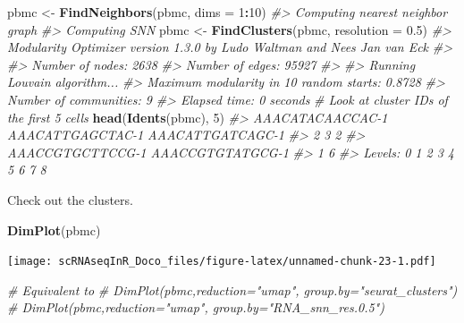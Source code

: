 \documentclass[
]{book}
\newenvironment{Shaded}{\begin{snugshade}}{\end{snugshade}}
\newcommand{\AttributeTok}[1]{\textcolor[rgb]{0.13,0.29,0.53}{#1}}
\newcommand{\CommentTok}[1]{\textcolor[rgb]{0.56,0.35,0.01}{\textit{#1}}}
\newcommand{\DecValTok}[1]{\textcolor[rgb]{0.00,0.00,0.81}{#1}}
\newcommand{\FloatTok}[1]{\textcolor[rgb]{0.00,0.00,0.81}{#1}}
\newcommand{\FunctionTok}[1]{\textcolor[rgb]{0.13,0.29,0.53}{\textbf{#1}}}
\newcommand{\NormalTok}[1]{#1}
\newcommand{\OtherTok}[1]{\textcolor[rgb]{0.56,0.35,0.01}{#1}}
\newcommand{\SpecialCharTok}[1]{\textcolor[rgb]{0.81,0.36,0.00}{\textbf{#1}}}
\begin{document}
\begin{Shaded}
\begin{Highlighting}[]
\NormalTok{pbmc }\OtherTok{\textless{}{-}} \FunctionTok{FindNeighbors}\NormalTok{(pbmc, }\AttributeTok{dims =} \DecValTok{1}\SpecialCharTok{:}\DecValTok{10}\NormalTok{)}
\CommentTok{\#\textgreater{} Computing nearest neighbor graph}
\CommentTok{\#\textgreater{} Computing SNN}
\NormalTok{pbmc }\OtherTok{\textless{}{-}} \FunctionTok{FindClusters}\NormalTok{(pbmc, }\AttributeTok{resolution =} \FloatTok{0.5}\NormalTok{)}
\CommentTok{\#\textgreater{} Modularity Optimizer version 1.3.0 by Ludo Waltman and Nees Jan van Eck}
\CommentTok{\#\textgreater{} }
\CommentTok{\#\textgreater{} Number of nodes: 2638}
\CommentTok{\#\textgreater{} Number of edges: 95927}
\CommentTok{\#\textgreater{} }
\CommentTok{\#\textgreater{} Running Louvain algorithm...}
\CommentTok{\#\textgreater{} Maximum modularity in 10 random starts: 0.8728}
\CommentTok{\#\textgreater{} Number of communities: 9}
\CommentTok{\#\textgreater{} Elapsed time: 0 seconds}
\CommentTok{\# Look at cluster IDs of the first 5 cells}
\FunctionTok{head}\NormalTok{(}\FunctionTok{Idents}\NormalTok{(pbmc), }\DecValTok{5}\NormalTok{)}
\CommentTok{\#\textgreater{} AAACATACAACCAC{-}1 AAACATTGAGCTAC{-}1 AAACATTGATCAGC{-}1 }
\CommentTok{\#\textgreater{}                2                3                2 }
\CommentTok{\#\textgreater{} AAACCGTGCTTCCG{-}1 AAACCGTGTATGCG{-}1 }
\CommentTok{\#\textgreater{}                1                6 }
\CommentTok{\#\textgreater{} Levels: 0 1 2 3 4 5 6 7 8}
\end{Highlighting}
\end{Shaded}

Check out the clusters.

\begin{Shaded}
\begin{Highlighting}[]
\FunctionTok{DimPlot}\NormalTok{(pbmc)}
\end{Highlighting}
\end{Shaded}

\texttt{[image: scRNAseqInR\_Doco\_files/figure-latex/unnamed-chunk-23-1.pdf]}

\begin{Shaded}
\begin{Highlighting}[]
\CommentTok{\# Equivalent to}
\CommentTok{\# DimPlot(pbmc,reduction="umap", group.by="seurat\_clusters")}
\CommentTok{\# DimPlot(pbmc,reduction="umap", group.by="RNA\_snn\_res.0.5")}
\end{Highlighting}
\end{Shaded}
\end{document}
